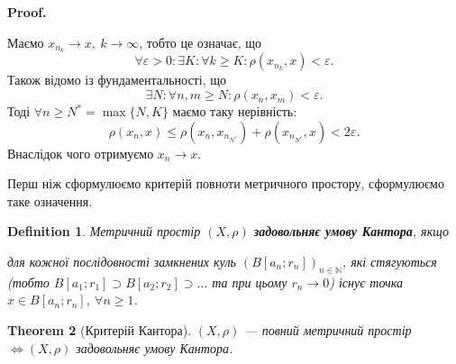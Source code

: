 \documentclass[a4paper, 10pt]{article}
\makeatletter
\theoremstyle{theoremdd}
\newtheorem{theorem}{Theorem}[subsection]
\theoremstyle{theoremdd}
\newtheorem{definition}[theorem]{Definition}
\theoremstyle{theoremdd}
\theoremstyle{theoremdd}
\theoremstyle{theoremdd}
\theoremstyle{theoremdd}
\theoremstyle{theoremdd}
\theoremstyle{theoremdd}
\renewenvironment{proof}[1][Proof.\\]{\par
\pushQED{\hfill \qed}%
\normalfont \topsep6\p@\@plus6\p@\relax
\trivlist
\item\relax
{\bfseries
#1\@addpunct{.}}\hspace\labelsep\ignorespaces
}{%
\popQED\endtrivlist\@endpefalse
}
\makeatother
\begin{document}
\begin{proof}
Маємо $x_{n_k} \to x,\ k \to \infty$, тобто це означає, що 
\[
\forall \varepsilon > 0: \exists K: \forall k \geq K: \rho(x_{n_k}, x) < \varepsilon.
\]
Також відомо із фундаментальності, що
\[
\exists N: \forall n,m \geq N: \rho(x_n,x_m) < \varepsilon.
\]
Тоді $\forall n \geq N^* = \max\{N,K\}$ маємо таку нерівність:
\[
\rho(x_n,x) \leq \rho(x_n,x_{n_{N^*}}) + \rho(x_{n_{N^*}},x) < 2\varepsilon.
\]
Внаслідок чого отримуємо $x_n \to x$.
\end{proof}

\noindent Перш ніж сформулюємо критерій повноти метричного простору, сформулюємо таке означення.

\begin{definition}
Метричний простір $(X,\rho)$ \textbf{задовольняє умову Кантора}, якщо
\begin{center}
для кожної послідовності замкнених куль $(B[a_n;r_n])_{n \in \mathbb{N}}$, які стягуються (тобто $B[a_1;r_1] \supset B[a_2;r_2] \supset \dots$ та при цьому $r_n \to 0$) існує точка $x \in B[a_n;r_n],\ \forall n \geq 1$. 
\end{center}
\end{definition}

\begin{theorem}[Критерій Кантора]
$(X,\rho)$ --- повний метричний простір $\iff (X,\rho)$ задовольняє умову Кантора.
\end{theorem}
\end{document}

